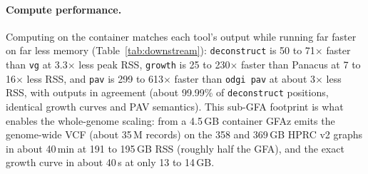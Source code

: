 \documentclass[11pt]{article}
\newcommand{\gfaz}{GFAz\xspace}
\begin{document}
\paragraph{Compute performance.}
Computing on the container matches each tool's output while running far faster on far
less memory (Table~\ref{tab:downstream}): \texttt{deconstruct} is 50 to 71$\times$
faster than \texttt{vg} at 3.3$\times$ less peak RSS, \texttt{growth} is 25 to
230$\times$ faster than Panacus at 7 to 16$\times$ less RSS, and \texttt{pav} is 299
to 613$\times$ faster than \texttt{odgi pav} at about 3$\times$ less RSS, with outputs
in agreement (about 99.99\% of \texttt{deconstruct} positions, identical growth curves
and PAV semantics). This sub-GFA footprint is what enables the whole-genome scaling:
from a 4.5\,GB container \gfaz emits the genome-wide VCF (about 35\,M records) on the
358 and 369\,GB HPRC v2 graphs in about 40\,min at 191 to 195\,GB RSS (roughly half
the GFA), and the exact growth curve in about 40\,s at only 13 to 14\,GB.
\end{document}
